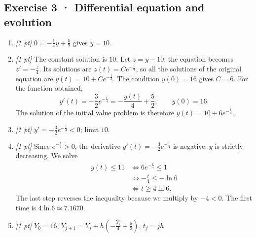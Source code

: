 \subsection*{Exercise 3 · Differential equation and evolution}\begin{enumerate}

\item \textit{[1 pt]} $0=-\frac{1}{4}y+\frac{5}{2}$ gives $y=10$.

\item \textit{[1 pt]} The constant solution is $10$. Let $z=y-10$; the equation becomes $z'=-\frac{z}{4}$. Its solutions are $z(t)=Ce^{-\frac{t}{4}}$, so all the solutions of the original equation are $y(t)=10+Ce^{-\frac{t}{4}}$.
The condition $y(0)=16$ gives $C=6$. For the function obtained,
\[y'(t)=-\frac{3}{2}e^{-\frac{t}{4}}=-\frac{y(t)}{4}+\frac{5}{2},\qquad y(0)=16.\]
The solution of the initial value problem is therefore $y(t)=10+6e^{-\frac{t}{4}}$.

\item \textit{[1 pt]} $y'=-\frac{3}{2}e^{-\frac{t}{4}}<0$; limit $10$.

\item \textit{[1 pt]} Since $e^{-\frac{t}{4}}>0$, the derivative $y'(t)=-\frac{3}{2}e^{-\frac{t}{4}}$ is negative: $y$ is strictly decreasing. We solve
\[\begin{aligned}y(t)\le 11&\Longleftrightarrow 6e^{-\frac{t}{4}}\le1\\&\Longleftrightarrow -\frac{t}{4}\le-\ln 6\\&\Longleftrightarrow t\ge 4\ln 6.\end{aligned}\]
The last step reverses the inequality because we multiply by $-4<0$. The first time is $4\ln 6\simeq\num{7,1670}$.

\item \textit{[1 pt]} $Y_0=16$, $Y_{j+1}=Y_j+h(-\frac{Y_j}{4}+\frac{5}{2})$, $t_j=jh$.

\end{enumerate}

